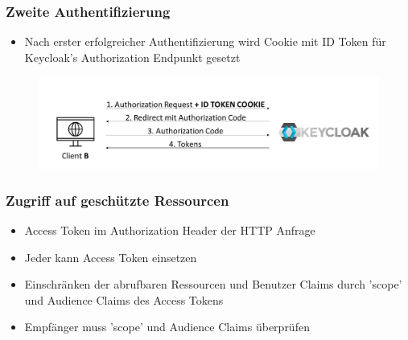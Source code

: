 \documentclass{beamer}
\begin{document}
\begin{frame}
\frametitle{Zweite Authentifizierung}
\begin{itemize}
\item Nach erster erfolgreicher Authentifizierung wird Cookie mit ID Token für Keycloak's Authorization Endpunkt gesetzt
\end{itemize}
\begin{figure}
\centerfloat
\includegraphics[width=1.1\linewidth]{img/authflow6.png}
\end{figure}
\end{frame}

\begin{frame}
\frametitle{Zugriff auf geschützte Ressourcen}
\begin{itemize}
\item Access Token im Authorization Header der HTTP Anfrage
\item Jeder kann Access Token einsetzen
\item Einschränken der abrufbaren Ressourcen und Benutzer Claims durch 'scope' und Audience Claims des Access Tokens
\item Empfänger muss 'scope' und Audience Claims überprüfen
\end{itemize}
\end{frame}
\end{document}

